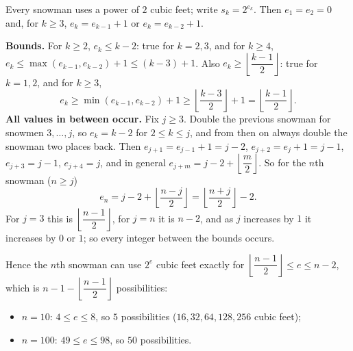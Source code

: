 Every snowman uses a power of $2$ cubic feet; write $s_k=2^{e_k}$. Then $e_1=e_2=0$ and, for $k\ge3$, $e_k=e_{k-1}+1$ or $e_k=e_{k-2}+1$.

\textbf{Bounds.} For $k\ge2$, $e_k\le k-2$: true for $k=2,3$, and for $k\ge4$, $e_k\le\max(e_{k-1},e_{k-2})+1\le(k-3)+1$. Also $e_k\ge\left\lfloor\dfrac{k-1}{2}\right\rfloor$: true for $k=1,2$, and for $k\ge3$,
\[e_k\ge\min(e_{k-1},e_{k-2})+1\ge\left\lfloor\dfrac{k-3}{2}\right\rfloor+1=\left\lfloor\dfrac{k-1}{2}\right\rfloor.\]
\textbf{All values in between occur.} Fix $j\ge3$. Double the previous snowman for snowmen $3,\dots,j$, so $e_k=k-2$ for $2\le k\le j$, and from then on always double the snowman two places back. Then $e_{j+1}=e_{j-1}+1=j-2$, $e_{j+2}=e_j+1=j-1$, $e_{j+3}=j-1$, $e_{j+4}=j$, and in general $e_{j+m}=j-2+\left\lfloor\dfrac{m}{2}\right\rfloor$. So for the $n$th snowman ($n\ge j$)
\[e_n=j-2+\left\lfloor\dfrac{n-j}{2}\right\rfloor=\left\lfloor\dfrac{n+j}{2}\right\rfloor-2.\]
For $j=3$ this is $\left\lfloor\dfrac{n-1}{2}\right\rfloor$, for $j=n$ it is $n-2$, and as $j$ increases by $1$ it increases by $0$ or $1$; so every integer between the bounds occurs.

Hence the $n$th snowman can use $2^e$ cubic feet exactly for $\left\lfloor\dfrac{n-1}{2}\right\rfloor\le e\le n-2$, which is $n-1-\left\lfloor\dfrac{n-1}{2}\right\rfloor$ possibilities:
\begin{itemize}
\item $n=10$: $4\le e\le8$, so $\boxed{5}$ possibilities ($16,32,64,128,256$ cubic feet);
\item $n=100$: $49\le e\le98$, so $\boxed{50}$ possibilities.
\end{itemize}
